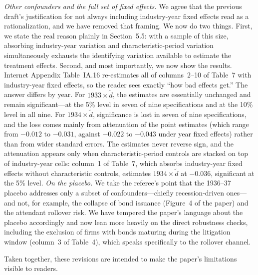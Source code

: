 \medskip
\noindent \textit{Other confounders and the full set of fixed effects.} We agree that the previous draft's justification for not always including industry-year fixed effects read as a rationalization, and we have removed that framing. We now do two things. First, we state the real reason plainly in Section~5.5: with a sample of this size, absorbing industry-year variation and characteristic-period variation simultaneously exhausts the identifying variation available to estimate the treatment effects. Second, and most importantly, we now show the results. Internet Appendix Table~IA.16 re-estimates all of columns~2--10 of Table~7 with industry-year fixed effects, so the reader sees exactly ``how bad effects get.'' The answer differs by year. For $1933 \times \tilde{d}$, the estimates are essentially unchanged and remain significant---at the 5\% level in seven of nine specifications and at the 10\% level in all nine. For $1934 \times \tilde{d}$, significance is lost in seven of nine specifications, and the loss comes mainly from attenuation of the point estimates (which range from $-0.012$ to $-0.031$, against $-0.022$ to $-0.043$ under year fixed effects) rather than from wider standard errors. The estimates never reverse sign, and the attenuation appears only when characteristic-period controls are stacked on top of industry-year cells: column~1 of Table~7, which absorbs industry-year fixed effects without characteristic controls, estimates $1934 \times \tilde{d}$ at $-0.036$, significant at the 5\% level.
\medskip
\noindent \textit{On the placebo.} We take the referee's point that the 1936--37 placebo addresses only a subset of confounders---chiefly recession-driven ones---and not, for example, the collapse of bond issuance (Figure~4 of the paper) and the attendant rollover risk. We have tempered the paper's language about the placebo accordingly and now lean more heavily on the direct robustness checks, including the exclusion of firms with bonds maturing during the litigation window (column~3 of Table~4), which speaks specifically to the rollover channel.

\medskip
\noindent Taken together, these revisions are intended to make the paper's limitations visible to readers.
